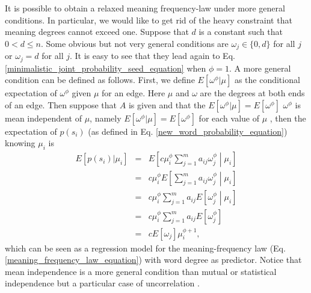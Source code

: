 \documentclass{article}
\begin{document}
It is possible to obtain a relaxed meaning frequency-law under more general conditions. In particular, we would like to get rid of the heavy constraint that meaning degrees cannot exceed one. Suppose that $d$ is a constant such that $0 < d \leq n$. Some obvious but not very general conditions are $\omega_j \in \{0,d\}$ for all $j$ or $\omega_j = d$ for all $j$. It is easy to see that they lead again to Eq. \ref{minimalistic_joint_probability_seed_equation} when $\phi = 1$.  
A more general condition can be defined as follows. First, we define $E[\omega^\phi | \mu]$ as the conditional expectation of $\omega^\phi$ given $\mu$ for an edge. Here $\mu$ and $\omega$ are the degrees at both ends of an edge. Then suppose that $A$ is given and that 
the $E[\omega^\phi | \mu] = E[\omega^\phi]$
$\omega^\phi$ is mean independent of $\mu$, namely $E[\omega^\phi | \mu] = E[\omega^\phi]$ for each value of $\mu$ \cite{Kolmogorov1956a,Poirier1995a}, then the expectation of $p(s_i)$ (as defined in Eq. \ref{new_word_probability_equation}) knowing $\mu_i$ is
\begin{eqnarray*}
E[p(s_i)|\mu_i] & = & E\left[c \mu_i^\phi \sum_{j=1}^m a_{ij}\omega_j^\phi \middle|  \mu_i \right] \\ 
                & = & c \mu_i^\phi E\left[\sum_{j=1}^m a_{ij}\omega_j^\phi \middle| \mu_i \right] \\
                & = & c \mu_i^\phi \sum_{j=1}^m a_{ij} E\left[\omega_j^\phi \middle| \mu_i \right] \\
                & = & c \mu_i^\phi \sum_{j=1}^m a_{ij} E\left[\omega_j^\phi \right] \\
                & = & c E[\omega_j] \mu_i^{\phi + 1},
\end{eqnarray*}
which can be seen as a regression model \cite{Ritz2008a} for the meaning-frequency law (Eq. \ref{meaning_frequency_law_equation}) with word degree as predictor. 
Notice that mean independence is a more general condition than mutual or statistical independence but a particular case of uncorrelation \cite{Ferrer2012h}. 
\end{document}
